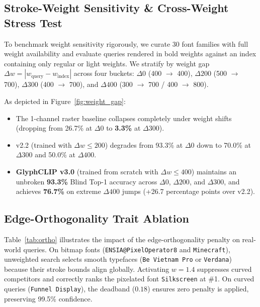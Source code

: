 \documentclass[10pt,twocolumn,letterpaper]{article}
\begin{document}
\subsection{Stroke-Weight Sensitivity \& Cross-Weight Stress Test}
To benchmark weight sensitivity rigorously, we curate 30 font families with full weight availability and evaluate queries rendered in bold weights against an index containing only regular or light weights. We stratify by weight gap $\Delta w = |w_{\text{query}} - w_{\text{index}}|$ across four buckets: $\Delta 0$ (400 $\to$ 400), $\Delta 200$ (500 $\to$ 700), $\Delta 300$ (400 $\to$ 700), and $\Delta 400$ (300 $\to$ 700 / 400 $\to$ 800).

As depicted in Figure~\ref{fig:weight_gap}:
\begin{itemize}
    \item The 1-channel raster baseline collapses completely under weight shifts (dropping from 26.7\% at $\Delta 0$ to \textbf{3.3\%} at $\Delta 300$).
    \item v2.2 (trained with $\Delta w \le 200$) degrades from 93.3\% at $\Delta 0$ down to 70.0\% at $\Delta 300$ and 50.0\% at $\Delta 400$.
    \item \textbf{GlyphCLIP v3.0} (trained from scratch with $\Delta w \le 400$) maintains an unbroken \textbf{93.3\%} Blind Top-1 accuracy across $\Delta 0$, $\Delta 200$, and $\Delta 300$, and achieves \textbf{76.7\%} on extreme $\Delta 400$ jumps (+26.7 percentage points over v2.2).
\end{itemize}

\subsection{Edge-Orthogonality Trait Ablation}
Table~\ref{tab:ortho} illustrates the impact of the edge-orthogonality penalty on real-world queries. On bitmap fonts (\texttt{ENSIA@PixelOperator8} and \texttt{Minecraft}), unweighted search selects smooth typefaces (\texttt{Be Vietnam Pro} or \texttt{Verdana}) because their stroke bounds align globally. Activating $w=1.4$ suppresses curved competitors and correctly ranks the pixelated font \texttt{Silkscreen} at \#1. On curved queries (\texttt{Funnel Display}), the deadband ($0.18$) ensures zero penalty is applied, preserving 99.5\% confidence.
\end{document}
